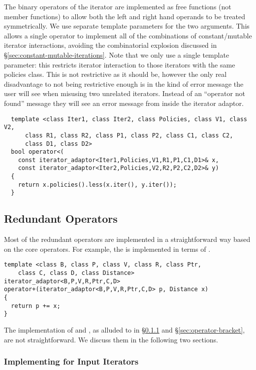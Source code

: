 \documentclass{netobjectdays}
\begin{document}
The binary operators of the iterator are implemented as free functions
(not member functions) to allow both the left and right hand operands
to be treated symmetrically.  We use separate template parameters for
the two  arguments. This allows a single
operator to implement all of the combinations of constant/mutable
iterator interactions, avoiding the combinatorial explosion discussed
in \S\ref{sec:constant-mutable-iterations}. Note that we only use a
single  template parameter: this restricts iterator
interaction to those iterators with the same policies class.  This is
not restrictive as it should be, however the only real disadvantage to
not being restrictive enough is in the kind of error message the user
will see when misusing two unrelated iterators. Instead of an
``operator not found'' message they will see an error message from
inside the iterator adaptor.

{\footnotesize
\begin{verbatim}
  template <class Iter1, class Iter2, class Policies, class V1, class V2,
      class R1, class R2, class P1, class P2, class C1, class C2, 
      class D1, class D2>
  bool operator<(
    const iterator_adaptor<Iter1,Policies,V1,R1,P1,C1,D1>& x,
    const iterator_adaptor<Iter2,Policies,V2,R2,P2,C2,D2>& y)
  {
    return x.policies().less(x.iter(), y.iter());
  }
\end{verbatim}
}


\subsection{Redundant Operators}

Most of the redundant operators are implemented in a straightforward
way based on the core operators. For example, the  is
implemented in terms of .

{\footnotesize
\begin{verbatim}
template <class B, class P, class V, class R, class Ptr,
    class C, class D, class Distance>
iterator_adaptor<B,P,V,R,Ptr,C,D>
operator+(iterator_adaptor<B,P,V,R,Ptr,C,D> p, Distance x)
{
  return p += x;
}
\end{verbatim}
}

The implementation of  and , as
alluded to in \S\ref{sec:operator-arrow} and
\S\ref{sec:operator-bracket}, are not straightforward. We discuss them
in the following two sections.


\subsubsection{Implementing  for Input Iterators}
\label{sec:operator-arrow}
\end{document}
